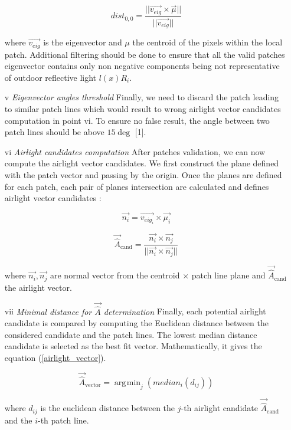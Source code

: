 \documentclass[conference]{IEEEtran}
\DeclareMathOperator*{\argmin}{\arg\!\min}
\begin{document}
\begin{itemize}[]
\begin{equation}
\label{Distance to origin}
dist_{0,0} = \frac{||\vec{v_{eig}} \times \vec{\mu}||}{||\vec{v_{eig}}||}
\end{equation}

where $\vec{v_{eig}}$ is the eigenvector and $\mu$ the centroid of the pixels within the local patch.
Additional filtering should be done to ensure that all the valid patches eigenvector contains only non negative components being 
not representative of outdoor reflective light $l(x)R_i$.

\item[v] \textit{Eigenvector angles threshold} Finally, we need to discard the patch leading to similar patch lines which would result 
to wrong airlight vector candidates computation in point vi.  To ensure no false result, the angle between two patch lines 
should be above $15 \deg$ [1].
\item[vi] \textit{Airlight candidates computation}  After patches validation, we can now compute the airlight vector candidates.
We first construct the plane defined with the patch vector and passing by the origin.  Once the planes are defined for each patch, each pair of planes 
 intersection are calculated and defines airlight vector candidates :

\begin{equation}
\label{Normal_vector}
\vec{n_i} = \vec{v_{eig_i}} \times \vec{\mu_i}
\end{equation}

\begin{equation}
\label{airlight_candidate}
\vec{\hat{A}}_{\text{cand}} = \frac{\vec{n_i} \times \vec{n_j}}{||\vec{n_i} \times \vec{n_j}||} 
\end{equation}

where $\vec{n_i}, \vec{n_j}$ are normal vector from the {centroid $\times$ patch line} plane and $\vec{\hat{A}}_{\text{cand}}$ the airlight vector.
\item[vii] \textit{Minimal distance for $\vec{\hat{A}}$ determination} Finally, each potential airlight candidate is compared by
computing the Euclidean distance between the considered candidate and the patch lines.  The lowest median distance candidate is selected as
the best fit vector.  Mathematically, it gives the equation (\ref{airlight_vector}).

\begin{equation}
\label{airlight_vector}
\vec{\hat{A}}_{\text{vector}} = \argmin_j(median_i(d_{ij})) 
\end{equation}

where $d_{ij}$ is the euclidean distance between the $j$-th airlight candidate $\vec{\hat{A}}_{\text{cand}}$ and the $i$-th patch line.
\end{itemize}   
\end{document}
